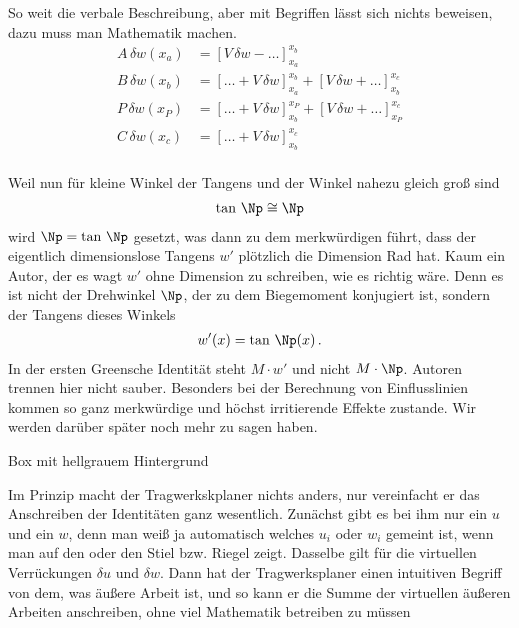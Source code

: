 So weit die verbale Beschreibung, aber mit Begriffen l\"{a}sst sich nichts beweisen, dazu muss man Mathematik machen.
\\

\begin{align}
A\,\delta w(x_a) &=  [V\, \delta w - \ldots]_{x_a}^{x_b} \\
B\,\delta w(x_b) &=  [\ldots + V\,\delta w]_{x_a}^{x_b} + [V\,\delta w + \ldots]_{x_b}^{x_c}\\
P\,\delta w(x_P) &=  [\ldots + V\,\delta w]_{x_b}^{x_P} + [V\,\delta w + \ldots]_{x_P}^{x_c}\\
C\,\delta w(x_c) &=  [\ldots + V\,\delta w]_{x_b}^{x_c}
\end{align}
\\

Weil nun f\"{u}r kleine Winkel der Tangens und der Winkel nahezu gleich gro{\ss} sind
\begin{align}
\tan\,\Np \cong \Np
\end{align}
wird $\Np = \tan\,\Np$ gesetzt, was dann zu dem merkw\"{u}rdigen f\"{u}hrt, dass der eigentlich dimensionslose Tangens $w'$ pl\"{o}tzlich die Dimension Rad hat. Kaum ein Autor, der es wagt $w'$ ohne Dimension zu schreiben, wie es richtig w\"{a}re.
Denn es ist nicht der Drehwinkel $\Np $, der zu dem Biegemoment konjugiert ist, sondern der Tangens dieses Winkels
\begin{align}
w'(x) = \tan\,\Np(x)\,.
\end{align}
In der ersten Greensche Identit\"{a}t steht $M \cdot w'$ und nicht $M \cdot \Np$.
Autoren trennen hier nicht sauber. Besonders bei der Berechnung von Einflusslinien kommen so ganz merkw\"{u}rdige und h\"{o}chst irritierende Effekte zustande. Wir werden dar\"{u}ber sp\"{a}ter noch mehr zu sagen haben.



\colorbox{hellgrau}{Box mit hellgrauem Hintergrund}

\colorbox{hellgrau}{\parbox{0.8\textwidth}{Im Prinzip macht der Tragwerkskplaner nichts anders, nur vereinfacht er das Anschreiben der Identit\"{a}ten ganz wesentlich. Zun\"{a}chst gibt es bei ihm nur ein $u$ und ein $w$, denn man wei{\ss} ja automatisch welches $u_i $ oder $w_i $ gemeint ist, wenn man auf den oder den Stiel bzw. Riegel zeigt. Dasselbe gilt f\"{u}r die virtuellen Verr\"{u}ckungen $\delta u$ und $\delta w$. Dann hat der Tragwerksplaner einen intuitiven Begriff von dem, was \"{a}u{\ss}ere Arbeit ist, und so kann er die Summe der virtuellen \"{a}u{\ss}eren Arbeiten anschreiben, ohne viel Mathematik betreiben zu m\"{u}ssen}}\\
\\

